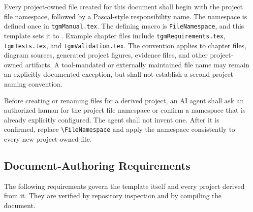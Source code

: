 Every project-owned file created for this document shall begin with the project
file namespace, followed by a Pascal-style responsibility name. The namespace
is defined once in \texttt{tgmManual.tex}. The defining macro is
\texttt{FileNamespace}, and this template sets it to
\texttt{\FileNamespace}. Example chapter files include
\texttt{tgmRequirements.tex}, \texttt{tgmTests.tex}, and
\texttt{tgmValidation.tex}. The convention applies to chapter files, diagram
sources, generated project figures, evidence files, and other project-owned
artifacts. A tool-mandated or externally maintained file name may remain an
explicitly documented exception, but shall not establish a second project
naming convention.

Before creating or renaming files for a derived project, an AI agent shall ask
an authorized human for the project file namespace or confirm a namespace that
is already explicitly configured. The agent shall not invent one. After it is
confirmed, replace \verb|\FileNamespace| and apply the namespace consistently
to every new project-owned file.

\subsection{Document-Authoring Requirements}
The following requirements govern the template itself and every project derived
from it. They are verified by repository inspection and by compiling the
document.

